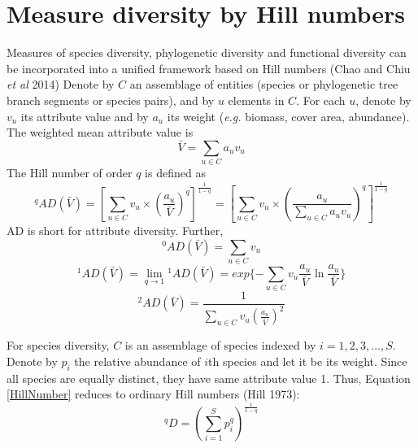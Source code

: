 \documentclass[11pt]{article}
\begin{document}
\section{Measure diversity by Hill numbers}
Measures of species diversity, phylogenetic diversity and functional diversity can be incorporated into a unified framework based on Hill numbers (Chao and Chiu \textit{et al} 2014)
Denote by $C$ an assemblage of entities (species or phylogenetic tree branch segments or species pairs), and by $u$ elements in $C$. 
For each $u$, denote by $v_u$ its attribute value and by $a_u$ its weight (\textit{e.g.} biomass, cover area, abundance). 
The weighted mean attribute value is
\begin{equation}
    \bar{V} = \sum\limits_{u\in C}a_uv_u
    \label{WeightedMeanAttributeValue}
\end{equation}
The Hill number of order $q$ is defined as 
\begin{equation}
    ^{q}AD(\bar{V}) = 
    [\sum\limits_{u\in C} v_u \times (\frac{a_u}{\bar{V}})^q]^{\frac{1}{1-q}} = [\sum\limits_{u\in C} v_u \times (\frac{a_u}{\sum\limits_{u\in C}a_uv_u})^q]^{\frac{1}{1-q}}
    \label{HillNumber}
\end{equation}
AD is short for attribute diversity. 
Further, 
\begin{equation}
    ^{0}AD(\bar{V}) = \sum\limits_{u\in C}v_u
\end{equation}
\begin{equation}
    ^{1}AD(\bar{V}) = \lim\limits_{q\rightarrow 1}{^{1}AD(\bar{V})} = exp\{-\sum\limits_{u\in C}v_u\frac{a_u}{\bar{V}}\ln\frac{a_u}{\bar{V}}\} 
\end{equation}
\begin{equation}
    ^{2}AD(\bar{V}) = \frac{1}{\sum\limits_{u\in C}v_u (\frac{a_u}{\bar{V}})^2}
\end{equation}

\newline

For species diversity, $C$ is an assemblage of species indexed by $i = 1,2,3,\dots,S$. 
Denote by $p_i$ the relative abundance of $i$th species and let it be its weight. 
Since all species are equally distinct, they have same attribute value 1. 
Thus, Equation \ref{HillNumber} reduces to ordinary Hill numbers (Hill 1973):
\begin{equation}
    ^{q}D = (\sum\limits_{i=1}^{S}p_i^q)^\frac{1}{1-q}
    \label{HillNUmber_Species}
\end{equation}

\newline
\end{document}
